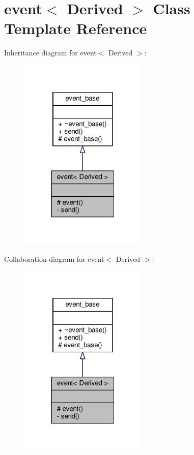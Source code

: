 \hypertarget{classevent}{}\section{event$<$ Derived $>$ Class Template Reference}
\label{classevent}


Inheritance diagram for event$<$ Derived $>$\+:
\nopagebreak
\begin{figure}[H]
\begin{center}
\leavevmode
\includegraphics[width=172pt]{classevent__inherit__graph}
\end{center}
\end{figure}


Collaboration diagram for event$<$ Derived $>$\+:
\nopagebreak
\begin{figure}[H]
\begin{center}
\leavevmode
\includegraphics[width=172pt]{classevent__coll__graph}
\end{center}
\end{figure}
